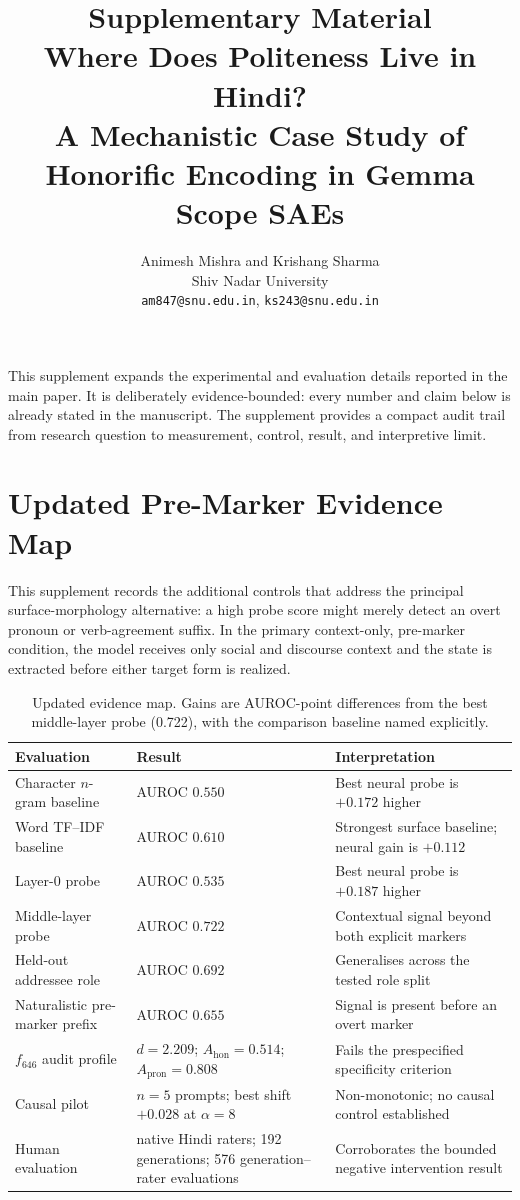 \documentclass[10pt]{article}
\title{Supplementary Material\\
Where Does Politeness Live in Hindi?\\
\large A Mechanistic Case Study of Honorific Encoding in Gemma Scope SAEs}
\author{Animesh Mishra and Krishang Sharma \\ Shiv Nadar University \\ \texttt{am847@snu.edu.in}, \texttt{ks243@snu.edu.in}}
\date{}
\begin{document}
\maketitle

This supplement expands the experimental and evaluation details reported in
the main paper. It is deliberately evidence-bounded: every number and claim
below is already stated in the manuscript. The supplement provides a compact
audit trail from research question to measurement, control, result, and
interpretive limit.

\section{Updated Pre-Marker Evidence Map}

This supplement records the additional controls that address the principal
surface-morphology alternative: a high probe score might merely detect an
overt pronoun or verb-agreement suffix. In the primary context-only, pre-marker
condition, the model receives only social and discourse context and the state is
extracted before either target form is realized.

\begin{table}[H]
\centering
\scriptsize
\setlength\tabcolsep{5pt}
\renewcommand{\arraystretch}{1.12}
\begin{tabularx}{\textwidth}{>{\raggedright\arraybackslash}X >{\raggedright\arraybackslash}X >{\raggedright\arraybackslash}X}
\toprule
\textbf{Evaluation} & \textbf{Result} & \textbf{Interpretation} \\
\midrule
Character $n$-gram baseline & AUROC $0.550$ & Best neural probe is $+0.172$ higher \\
Word TF--IDF baseline & AUROC $0.610$ & Strongest surface baseline; neural gain is $+0.112$ \\
Layer-0 probe & AUROC $0.535$ & Best neural probe is $+0.187$ higher \\
Middle-layer probe & AUROC $0.722$ & Contextual signal beyond both explicit markers \\
Held-out addressee role & AUROC $0.692$ & Generalises across the tested role split \\
Naturalistic pre-marker prefix & AUROC $0.655$ & Signal is present before an overt marker \\
$f_{646}$ audit profile & $d=2.209$; $A_{\mathrm{hon}}=0.514$; $A_{\mathrm{pron}}=0.808$ & Fails the prespecified specificity criterion \\
Causal pilot & $n=5$ prompts; best shift $+0.028$ at $\alpha=8$ & Non-monotonic; no causal control established \\
Human evaluation & 3 native Hindi raters; 192 generations; 576 generation--rater evaluations & Corroborates the bounded negative intervention result \\
\bottomrule
\end{tabularx}
\caption{Updated evidence map. Gains are AUROC-point differences from the best
middle-layer probe (0.722), with the comparison baseline named explicitly.}
\label{tab:updated-evidence}
\end{table}
\end{document}
